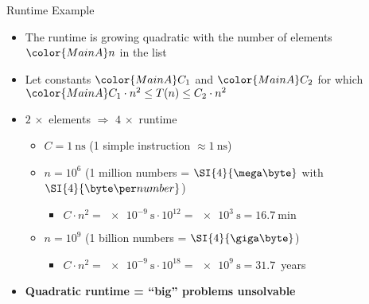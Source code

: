 \begin{frame}{Runtime Example}
  \begin{itemize}
    \item<1- |handout:1>
      The runtime is growing quadratic with the number of elements
      ${\color{MainA}n}$ in the list
    \item<2- |handout:1>
      Let constants $\color{MainA}C_1$ and $\color{MainA}C_2$
      for which $\color{MainA}C_1 \cdot n^2 \leq T(n) \leq C_2 \cdot n^2$
    \item<3- |handout:1>
      $2\, \times$ elements $\Rightarrow$ $4\, \times$ runtime
      \begin{itemize}
        \item<4- |handout:1>
          $C = \SI{1}{\nano\second}$
          (1 simple instruction $\approx \SI{1}{\nano\second}$)
        \item<5- |handout:1>
          $n = 10^6$ (1 million numbers = $\SI{4}{\mega\byte}$
          with $\SI{4}{\byte\per number}$)
          \begin{itemize}
            \item
              $C \cdot n^2 = \SI{e-9}{\second} \cdot 10^{12}
              = \SI{e3}{\second} = \SI{16.7}{\minute}$
          \end{itemize}
        \item<6- |handout:1>
          $n = 10^9$ (1 billion numbers = $\SI{4}{\giga\byte}$)
          \begin{itemize}
            \item
              $C \cdot n^2 = \SI{e-9}{\second} \cdot 10^{18}
              = \SI{e9}{\second} = 31.7$~years
          \end{itemize}
      \end{itemize}
    \item<7- |handout:1>
      \textbf{Quadratic runtime = \enquote{big} problems unsolvable}
  \end{itemize}
\end{frame}
